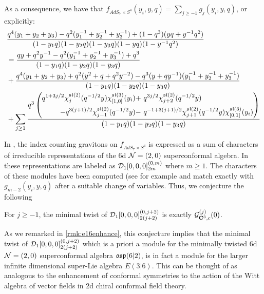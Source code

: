 \documentclass[../main.tex]{subfiles}
\begin{document}
\parsec[]
As a consequence, we have that $f_{AdS_7\times S^4} (y_i, y, q) = \sum_{j\geq -1} g_j (y_i, y, q)$, or explicitly:
\begin{align*}
& \frac{q^4(y_1+y_2+y_3)-q^2(y_1^{-1} + y_2^{-1} + y_3^{-1})+ (1-q^3)(yq + y^{-1} q^2)}{(1-y_1 q)(1-y_2 q)(1-y_3 q)(1-yq)(1-y^{-1} q^2)}  \\ 
& =  \frac{qy + q^2y^{-1} - q^2(y^{-1}_1+y^{-1}_2+y^{-1}_3) + q^3}{(1-y_1q) (1-y_2 q) (1-y_3 q)} \\
& +  \frac{q^4(y_1+y_2+y_3) + q^2 (y^2 + q + q^2 y^{-2}) - q^{3} (y + q y^{-1})(y_1^{-1} + y_2^{-1} + y_3^{-1})}{(1-y_1q) (1-y_2 q) (1-y_3 q)} \\
& + \sum_{j\geq 1} \frac{ q^{3} \left( \begin{aligned} q^{1 + 3 j/2} \chi^{\mathfrak{sl}(2)}_{j}(q^{-1/2} y)\chi^{\mathfrak{sl}(3)}_{[1,0]}(y_i) + \  & q^{3j/2} \chi^{\mathfrak{sl}(2)}_{j+2}(q^{-1/2} y)  \\
 - q^{3(j+1)/2} \chi^{\mathfrak{sl}(2)}_{j-1}(q^{-1/2}y) - \ & q^{-1 + 3(j+1)/2} \chi^{\mathfrak{sl}(2)}_{j+1} (q^{-1/2} y) \chi^{\mathfrak{sl}(3)}_{[0,1]}(y_i) \end{aligned} \right)}{(1-y_1 q)(1-y_2q)(1-y_3q)}
\end{align*}

In \cite[Eq. (3.22, 3.23)]{Bhattacharya:2008zy}, the index counting gravitons on $f_{AdS_7\times S^4}$ is expressed as a sum of characters of irreducible representations of the 6d $\mathcal{N} = (2,0)$ superconformal algebra. In \cite[Table 24]{cordova2016multiplets} these representations are labeled as $\mathcal{D}_1[0,0,0]^{(0,m)}_{2m}$ where $m \geq 1$. The characters of these modules have been computed (see for example \cite[Eq. (166)]{Arai_2020} and match exactly with $g_{m-2}(y_i, y, q)$ after a suitable change of variables. Thus, we conjecture the following

\begin{conj}
For $j\geq -1$, the minimal twist of $\mathcal{D}_1[0,0,0]^{(0,j+2)}_{2(j+2)}$ is exactly $\mathcal{G}^{(j)}_{\mathbf{C}^3, c}(0)$.
\end{conj}

\begin{rmk}\label{rmk:e36enhance}
As we remarked in \ref{rmk:e16enhance}, this conjecture implies that the minimal twist of $\mathcal{D}_1[0,0,0]^{(0,j+2)}_{2(j+2)}$ which is a priori a module for the minimally twisted 6d $\mathcal{N}=(2,0)$ superconformal algebra $\mathfrak{osp}(6|2)$, is in fact a module for the larger infinite dimensional super-Lie algebra $E(3|6)$. This can be thought of as analogous to the enhancement of conformal symmetries to the action of the Witt algebra of vector fields in 2d chiral conformal field theory.
\end{rmk}
\end{document}
